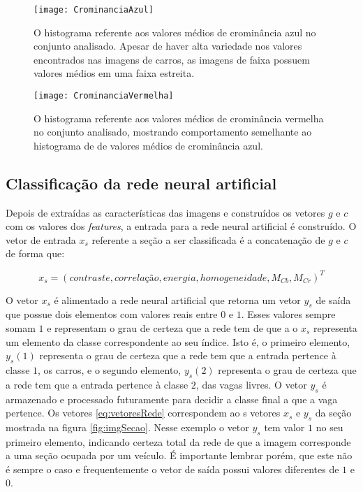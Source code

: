 \begin{figure}
	\centering
	\texttt{[image: CrominanciaAzul]}
	\label{fig:histCb}
	\caption{O histograma referente aos valores médios de crominância azul no conjunto analisado. Apesar de haver alta variedade nos valores encontrados nas imagens de carros, as imagens de faixa possuem valores médios em uma faixa estreita. }
	\centering
\end{figure}

\begin{figure}
	\centering
	\texttt{[image: CrominanciaVermelha]}
	\label{fig:histCr}
	\caption{O histograma referente aos valores médios de crominância vermelha no conjunto analisado, mostrando comportamento semelhante ao histograma de de valores médios de crominância azul. }
	\centering
\end{figure}


\subsection{Classificação da rede neural artificial}

Depois de extraídas as características das imagens e construídos os vetores $g$ e $c$ com os valores dos \textit{features}, a entrada para a rede neural artificial é construído. O vetor de entrada $x_s$ referente a seção a ser classificada é a concatenação de $g$ e $c$ de forma que:

\begin{equation}
	x_s = (contraste, correlação, energia, homogeneidade, M_{Cb}, M_{Cr})^T
\end{equation}

O vetor $x_s$ é alimentado a rede neural artificial que retorna um vetor $y_s$ de saída que possue dois elementos com valores reais entre $0$ e $1$. Esses valores sempre somam $1$ e representam o grau de certeza que a rede tem de que a o $x_s$ representa um elemento da classe correspondente ao seu índice. Isto é, o primeiro elemento, $y_s(1)$ representa o grau de certeza que a rede tem que a entrada pertence à classe $1$, os carros, e o segundo elemento, $y_s(2)$ representa o grau de certeza que a rede tem que a entrada pertence à classe $2$, das vagas livres. O vetor $y_s$ é armazenado e processado futuramente para decidir a classe final a que a vaga pertence. Os vetores \ref{eq:vetoresRede} correspondem ao s vetores $x_s$ e $y_s$ da seção mostrada na figura \ref{fig:imgSecao}. Nesse exemplo o vetor $y_s$ tem valor $1$ no seu primeiro elemento, indicando certeza total da rede de que a imagem corresponde a uma seção ocupada por um veículo. É importante lembrar porém, que este não é sempre o caso e frequentemente o vetor de saída possui valores diferentes de $1$ e $0$.

